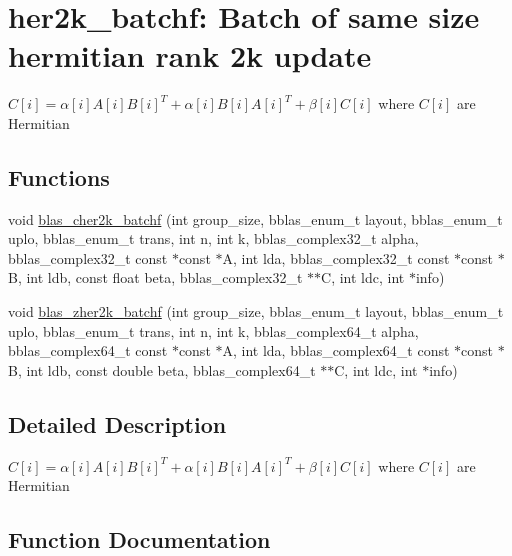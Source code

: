 \hypertarget{group__her2k__batchf}{}\section{her2k\+\_\+batchf\+: Batch of same size hermitian rank 2k update}
\label{group__her2k__batchf}


$ C[i] = \alpha[i] A[i] B[i]^T + \alpha[i] B[i] A[i]^T + \beta[i] C[i] $ where $ C[i] $ are Hermitian  


\subsection*{Functions}
\begin{DoxyCompactItemize}
\item 
void \mbox{\hyperlink{group__her2k__batchf_ga667de74c541bf4b6991302ad000643ab}{blas\+\_\+cher2k\+\_\+batchf}} (int group\+\_\+size, bblas\+\_\+enum\+\_\+t layout, bblas\+\_\+enum\+\_\+t uplo, bblas\+\_\+enum\+\_\+t trans, int n, int k, bblas\+\_\+complex32\+\_\+t alpha, bblas\+\_\+complex32\+\_\+t const $\ast$const $\ast$A, int lda, bblas\+\_\+complex32\+\_\+t const $\ast$const $\ast$B, int ldb, const float beta, bblas\+\_\+complex32\+\_\+t $\ast$$\ast$C, int ldc, int $\ast$info)
\item 
void \mbox{\hyperlink{group__her2k__batchf_ga809637abe18dd60393b5d0f1baa11dc8}{blas\+\_\+zher2k\+\_\+batchf}} (int group\+\_\+size, bblas\+\_\+enum\+\_\+t layout, bblas\+\_\+enum\+\_\+t uplo, bblas\+\_\+enum\+\_\+t trans, int n, int k, bblas\+\_\+complex64\+\_\+t alpha, bblas\+\_\+complex64\+\_\+t const $\ast$const $\ast$A, int lda, bblas\+\_\+complex64\+\_\+t const $\ast$const $\ast$B, int ldb, const double beta, bblas\+\_\+complex64\+\_\+t $\ast$$\ast$C, int ldc, int $\ast$info)
\end{DoxyCompactItemize}


\subsection{Detailed Description}
$ C[i] = \alpha[i] A[i] B[i]^T + \alpha[i] B[i] A[i]^T + \beta[i] C[i] $ where $ C[i] $ are Hermitian 



\subsection{Function Documentation}
\mbox{\label{group__her2k__batchf_ga667de74c541bf4b6991302ad000643ab}} 
